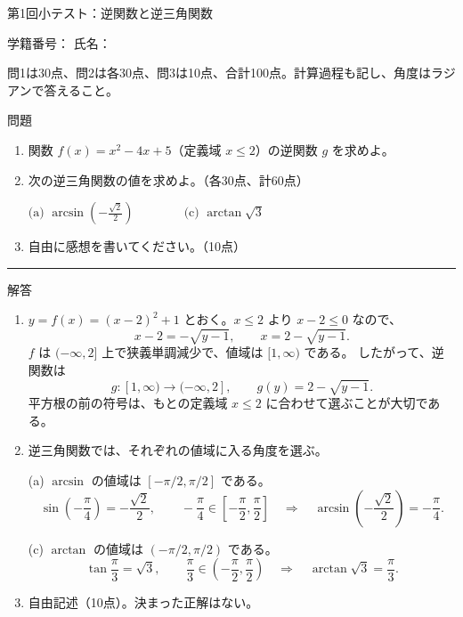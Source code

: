 \documentclass[a4paper,10pt,dvipdfmx]{jsarticle}
\renewcommand{\handout}[2]{%
  \def\handoutnumber{第#1回}%
  \begin{center}
    {\Large\normalfont\mdseries\color{ink}第#1回\quad #2}\par
    \vspace{2pt}{\color{accent}\rule{0.88\linewidth}{1.2pt}}
  \end{center}\vspace{2pt}}
\renewcommand{\topic}[1]{\par\vspace{5pt}%
  {\large\normalfont\mdseries\color{accent}#1}\par\vspace{1pt}}
\begin{document}
\handout{1}{小テスト：逆関数と逆三角関数}

学籍番号：\underline{\hspace{40mm}}\hfill
氏名：\underline{\hspace{40mm}}

問1は30点、問2は各30点、問3は10点、合計100点。計算過程も記し、角度はラジアンで答えること。

\topic{問題}
\begin{enumerate}[label=\color{accent}\arabic*.,leftmargin=2.4em,itemsep=9pt]
\item 関数 $f(x)=x^2-4x+5$（定義域 $x\leq 2$）の逆関数 $g$ を求めよ。
\par\vspace{40mm}

\item 次の逆三角関数の値を求めよ。\hfill（各30点、計60点）
\begin{center}
  $\displaystyle
    \text{(a) }\arcsin\!\left(-\frac{\sqrt{2}}{2}\right)
    \qquad
    \qquad
    \text{(c) }\arctan\sqrt{3}$
\end{center}
\par\vspace{45mm}
\item 自由に感想を書いてください。\hfill（10点）
\par\vspace{40mm}
\end{enumerate}
\newpage
\vspace{4mm}
{\color{accent}\rule{\linewidth}{0.6pt}}
\topic{解答}
\begin{enumerate}[label=\color{accent}\arabic*.,leftmargin=2.4em,itemsep=9pt]
\item $y=f(x)=(x-2)^2+1$ とおく。$x\leq 2$ より $x-2\leq 0$ なので、
$$
 x-2=-\sqrt{y-1},\qquad x=2-\sqrt{y-1}.
$$
$f$ は $(-\infty,2]$ 上で狭義単調減少で、値域は $[1,\infty)$ である。
したがって、逆関数は
$$
 g\colon[1,\infty)\longrightarrow(-\infty,2],\qquad
 g(y)=2-\sqrt{y-1}.
$$
平方根の前の符号は、もとの定義域 $x\leq2$ に合わせて選ぶことが大切である。

\item 逆三角関数では、それぞれの値域に入る角度を選ぶ。

(a) $\arcsin$ の値域は $[-\pi/2,\pi/2]$ である。
$$
 \sin\!\left(-\frac\pi4\right)=-\frac{\sqrt2}{2},\qquad
 -\frac\pi4\in\left[-\frac\pi2,\frac\pi2\right]
 \quad\Longrightarrow\quad
 \arcsin\!\left(-\frac{\sqrt2}{2}\right)=-\frac\pi4.
$$

\medskip
(c) $\arctan$ の値域は $(-\pi/2,\pi/2)$ である。
$$
 \tan\frac\pi3=\sqrt3,\qquad
 \frac\pi3\in\left(-\frac\pi2,\frac\pi2\right)
 \quad\Longrightarrow\quad
 \arctan\sqrt3=\frac\pi3.
$$
\item 自由記述（10点）。決まった正解はない。
\end{enumerate}
\end{document}
